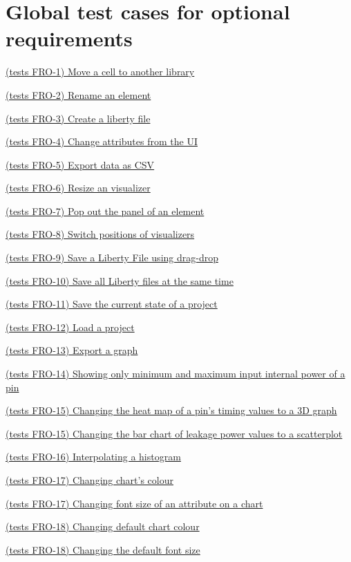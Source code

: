 \documentclass[10pt,a4paper]{report}
\newcommand{\refer}[2]{\hyperref[#1]{\textcolor{col:reference}{#2}}}
\begin{document}
\section{Global test cases for optional requirements}
\begin{GTCO}
    \item  \refer{GTCO-1}{(tests FRO-1) Move a cell to another library}
    \item  \refer{GTCO-2}{(tests FRO-2) Rename an element}
    \item  \refer{GTCO-3}{(tests FRO-3) Create a liberty file}
    \item  \refer{GTCO-4}{(tests FRO-4) Change attributes from the UI}
    \item  \refer{GTCO-5}{(tests FRO-5) Export data as CSV}
    \item  \refer{GTCO-6}{(tests FRO-6) Resize an visualizer}
    \item  \refer{GTCO-7}{(tests FRO-7) Pop out the panel of an element}
    \item  \refer{GTCO-8}{(tests FRO-8) Switch positions of visualizers}
    \item  \refer{GTCO-9}{(tests FRO-9) Save a Liberty File using drag-drop}
    \item  \refer{GTCO-10}{(tests FRO-10) Save all Liberty files at the same time}
    \item  \refer{GTCO-11}{(tests FRO-11) Save the current state of a project}
    \item  \refer{GTCO-12}{(tests FRO-12) Load a project}
    \item  \refer{GTCO-13}{(tests FRO-13) Export a graph}
    \item  \refer{GTCO-14}{(tests FRO-14) Showing only minimum and maximum input internal power of a pin}
    \item  \refer{GTCO-15}{(tests FRO-15) Changing the heat map of a pin’s timing values to a 3D graph}
    \item  \refer{GTCO-16}{(tests FRO-15) Changing the bar chart of leakage power values to a scatterplot}
    \item  \refer{GTCO-17}{(tests FRO-16) Interpolating a histogram}
    \item  \refer{GTCO-18}{(tests FRO-17)  Changing chart’s colour}
    \item  \refer{GTCO-19}{(tests FRO-17) Changing font size of an attribute on a chart}
    \item  \refer{GTCO-20}{(tests FRO-18) Changing default chart colour }
    \item  \refer{GTCO-21}{(tests FRO-18) Changing the default font size}

\end{GTCO}
\end{document}
